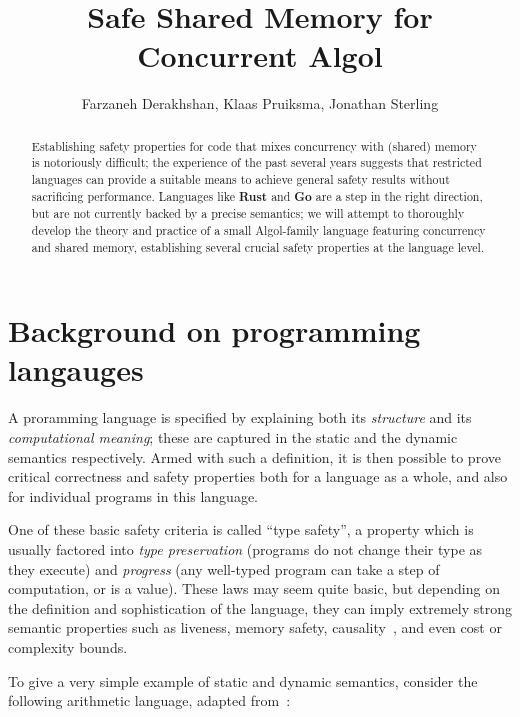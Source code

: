 \documentclass{article}
\title{Safe Shared Memory for Concurrent Algol}
\author{Farzaneh Derakhshan, Klaas Pruiksma, Jonathan Sterling}
\newcommand\Lang[1]{{\sffamily\bfseries{#1}}}
\begin{document}
\maketitle

\begin{abstract}
  Establishing safety properties for code that mixes concurrency with
  (shared) memory is notoriously difficult; the experience of the past
  several years suggests that restricted languages can provide a
  suitable means to achieve general safety results without sacrificing
  performance. Languages like \Lang{Rust} and \Lang{Go} are a step in
  the right direction, but are not currently backed by a precise
  semantics; we will attempt to thoroughly develop the theory and
  practice of a small Algol-family language featuring concurrency and
  shared memory, establishing several crucial safety properties at the
  language level.
\end{abstract}

\section{Background on programming langauges}

A proramming language is specified by explaining both its
\emph{structure} and its \emph{computational meaning}; these are
captured in the static and the dynamic semantics respectively. Armed
with such a definition, it is then possible to prove critical
correctness and safety properties both for a language as a whole, and
also for individual programs in this language.

One of these basic safety criteria is called ``type safety'', a
property which is usually factored into \emph{type preservation}
(programs do not change their type as they execute) and
\emph{progress} (any well-typed program can take a step of
computation, or is a value). These laws may seem quite basic, but
depending on the definition and sophistication of the language, they
can imply extremely strong semantic properties such as liveness,
memory safety, causality~\cite{atkey-mcbride:2013}, and even cost or
complexity bounds.

To give a very simple example of static and dynamic semantics,
consider the following arithmetic language, adapted
from~\cite{harper:2016}:

\newcommand\IsOk[1]{{#1}\ \mathsf{ok}}
\newcommand\IsVal[1]{{#1}\ \mathsf{val}}
\newcommand\Step[2]{{#1}\mapsto{#2}}
\newcommand\Plus[2]{\mathtt{plus} (#1, #2)}
\newcommand\Num[1]{\mathtt{num}[#1]}
\end{document}
